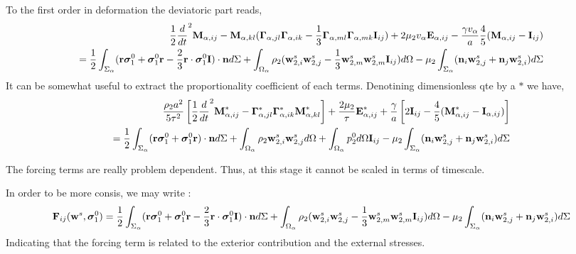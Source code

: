 To the first order in deformation the deviatoric part reads, 
\begin{align*}
    \frac{1}{2}\frac{d}{d t}^2 \textbf{M}_{\alpha,ij}
    -   \textbf{M}_{\alpha,kl} 
    (\bm\Gamma_{\alpha,jl}\bm\Gamma_{\alpha,ik}  
    - \frac{1}{3}
    \bm\Gamma_{\alpha,ml}\bm\Gamma_{\alpha,mk}  
    \textbf{I}_{ij}
    )
    + 2 \mu_2 v_\alpha \textbf{E}_{\alpha,ij}
    - \frac{\gamma v_\alpha }{a} 
    \frac{4  }{5} (\textbf{M}_{\alpha,ij}- \textbf{I}_{ij})
    \\
    = 
    \frac{1}{2}\int_{\Sigma_\alpha} (\textbf{r}\bm\sigma_1^0 + \bm\sigma_1^0\textbf{r} - \frac{2}{3}\textbf{r}\cdot \bm\sigma_1^0 \textbf{I})\cdot \textbf{n} d\Sigma 
    + \int_{\Omega_\alpha} \rho_2 (\textbf{w}_{2,i}^s\textbf{w}_{2,j}^s - \frac{1}{3}\textbf{w}_{2,m}^s\textbf{w}_{2,m}^s \textbf{I}_{ij})  d\Omega
    - \mu_2 \int_{\Sigma_\alpha} (\textbf{n}_i \textbf{w}_{2,j}^s + \textbf{n}_j \textbf{w}_{2,i}^s) d\Sigma\\
\end{align*}
It can be somewhat useful to extract the proportionality coefficient of each terms. 
Denotining dimensionless qte by a $*$ we have, 
\begin{align*}
    \frac{\rho_2 a^2}{5 \tau^2}\left[\frac{1}{2}\frac{d}{d t}^2 \textbf{M}_{\alpha,ij}^*
    -  \bm\Gamma_{\alpha,jl}^*\bm\Gamma_{\alpha,ik}^* \textbf{M}_{\alpha,kl}^*
    \right]  
    + \frac{2 \mu_2  }{\tau} \textbf{E}_{\alpha,ij}^*
    + \frac{\gamma  }{a} \left[
    2\textbf{I}_{ij} 
    - \frac{4 }{5} (\textbf{M}_{\alpha,ij}^* - \textbf{I}_{\alpha,ij})
    \right]\\
    = 
    \frac{1}{2}\int_{\Sigma_\alpha} (\textbf{r}\bm\sigma_1^0 + \bm\sigma_1^0\textbf{r})\cdot \textbf{n} d\Sigma 
    + \int_{\Omega_\alpha} \rho_2 \textbf{w}_{2,i}^s\textbf{w}_{2,j}^s d\Omega
    + \int_{\Omega_\alpha} p_2^0 d\Omega \textbf{I}_{ij}
    - \mu_2 \int_{\Sigma_\alpha} (\textbf{n}_i \textbf{w}_{2,j}^s + \textbf{n}_j \textbf{w}_{2,i}^s) d\Sigma\\
\end{align*}

The forcing terms are really problem dependent. 
Thus, at this stage it cannot be scaled in terms of timescale. 

In order to be more consis, we may write :
\begin{align*}
    \textbf{F}_{ij}(\textbf{w}^s,\bm\sigma_1^0)
    = 
    \frac{1}{2}\int_{\Sigma_\alpha} (\textbf{r}\bm\sigma_1^0 + \bm\sigma_1^0\textbf{r} - \frac{2}{3}\textbf{r}\cdot \bm\sigma_1^0 \textbf{I})\cdot \textbf{n} d\Sigma 
    + \int_{\Omega_\alpha} \rho_2 (\textbf{w}_{2,i}^s\textbf{w}_{2,j}^s - \frac{1}{3}\textbf{w}_{2,m}^s\textbf{w}_{2,m}^s \textbf{I}_{ij})  d\Omega
    - \mu_2 \int_{\Sigma_\alpha} (\textbf{n}_i \textbf{w}_{2,j}^s + \textbf{n}_j \textbf{w}_{2,i}^s) d\Sigma\\
\end{align*} 
Indicating that the forcing term is related to the exterior contribution and the external stresses. 

